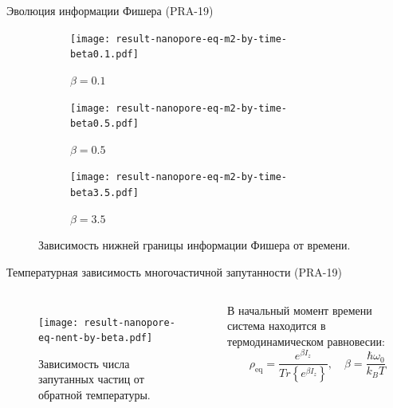 \begin{frame}{Эволюция информации Фишера (PRA-19)}
  \begin{figure}
    \begin{subfigure}[t]{0.3\textwidth}
      \texttt{[image: result-nanopore-eq-m2-by-time-beta0.1.pdf]}
      \caption{$\beta = 0.1$}
    \end{subfigure}
    \begin{subfigure}[t]{0.3\textwidth}
      \texttt{[image: result-nanopore-eq-m2-by-time-beta0.5.pdf]}
      \caption{$\beta = 0.5$}
    \end{subfigure}
    \begin{subfigure}[t]{0.3\textwidth}
      \texttt{[image: result-nanopore-eq-m2-by-time-beta3.5.pdf]}
      \caption{$\beta = 3.5$}
    \end{subfigure}
    \caption{Зависимость нижней границы информации Фишера от времени.}
  \end{figure}
\end{frame}


\begin{frame}{Температурная зависимость многочастичной запутанности (PRA-19)}
\begin{columns}
    \begin{figure}
    \texttt{[image: result-nanopore-eq-nent-by-beta.pdf]}
    \caption{Зависимость числа запутанных частиц от обратной температуры.}
    \end{figure}


    В начальный момент времени система находится в термодинамическом равновесии:
    $$
    \rho_\mathrm{eq} = \dfrac{ e^{\beta I_z} }{Tr \left\{ e^{\beta I_z} \right\} },
    \quad
    \beta = \dfrac{\hbar \omega_0}{k_{B} T}
    $$
\end{columns}
\end{frame}


